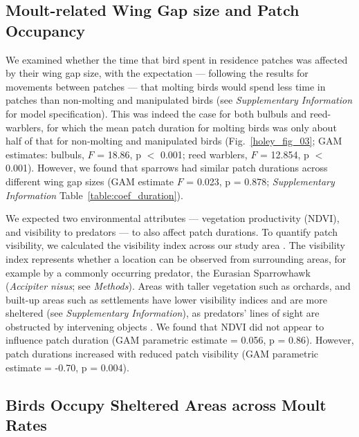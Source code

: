 \subsection*{Moult-related Wing Gap size and Patch Occupancy}

We examined whether the time that bird spent in residence patches was affected by their wing gap size, with the expectation --- following the results for movements between patches --- that molting birds would spend less time in patches than non-molting and manipulated birds (see \textit{Supplementary Information} for model specification).
This was indeed the case for both bulbuls and reed-warblers, for which the mean patch duration for molting birds was only about half of that for non-molting and manipulated birds (Fig.~\ref{holey_fig_03}; GAM estimates: bulbuls, $F$ = 18.86, p $<$ 0.001; reed warblers, $F$ = 12.854, p $<$ 0.001).
However, we found that sparrows had similar patch durations across different wing gap sizes (GAM estimate $F$ = 0.023, p = 0.878; \textit{Supplementary Information} Table~\ref{table:coef_duration}).

We expected two environmental attributes --- vegetation productivity (NDVI), and visibility to predators --- to also affect patch durations.
To quantify patch visibility, we calculated the visibility index across our study area \cite{olsoy2015,aben2018,aben2021}.
The visibility index represents whether a location can be observed from surrounding areas, for example by a commonly occurring predator, the Eurasian Sparrowhawk (\textit{Accipiter nisus}; see \textit{Methods}).
Areas with taller vegetation such as orchards, and built-up areas such as settlements have lower visibility indices and are more sheltered (see \textit{Supplementary Information}), as predators' lines of sight are obstructed by intervening objects \cite{olsoy2015}.
We found that NDVI did not appear to influence patch duration (GAM parametric estimate = 0.056, p = 0.86).
However, patch durations increased with reduced patch visibility (GAM parametric estimate = -0.70, p = 0.004).

\subsection*{Birds Occupy Sheltered Areas across Moult Rates}

